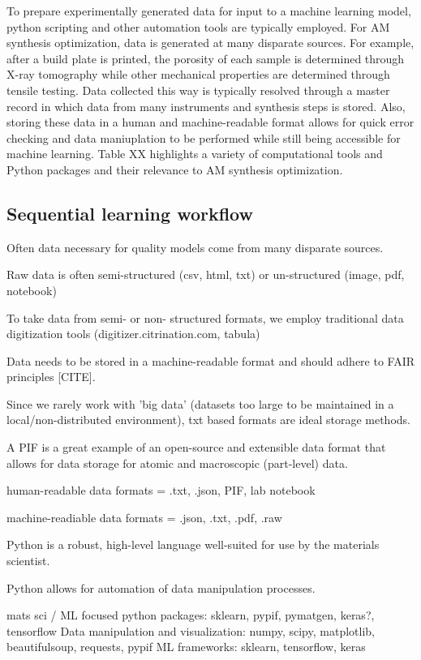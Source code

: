 To prepare experimentally generated data for input to a machine learning model, python scripting and other automation tools are typically employed.
For AM synthesis optimization, data is generated at many disparate sources.
For example, after a build plate is printed, the porosity of each sample is determined through X-ray tomography while other mechanical properties are determined through tensile testing.
Data collected this way is typically resolved through a master record in which data from many instruments and synthesis steps is stored.
Also, storing these data in a human and machine-readable format allows for quick error checking and data maniuplation to be performed while still being accessible for machine learning.
Table XX highlights a variety of computational tools and Python packages and their relevance to AM synthesis optimization.



\subsection{Sequential learning workflow}



Often data necessary for quality models come from many disparate sources.

Raw data is often semi-structured (csv, html, txt) or un-structured (image, pdf, notebook)

To take data from semi- or non- structured formats, we employ traditional data digitization tools (digitizer.citrination.com, tabula)

Data needs to be stored in a machine-readable format and should adhere to FAIR principles [CITE].

Since we rarely work with 'big data' (datasets too large to be maintained in a local/non-distributed environment), txt based formats are ideal storage methods.

A PIF is a great example of an open-source and extensible data format that allows for data storage for atomic and macroscopic (part-level) data.

human-readable data formats = .txt, .json, PIF, lab notebook

machine-readiable data formats = .json, .txt, .pdf, .raw

Python is a robust, high-level language well-suited for use by the materials scientist.

Python allows for automation of data manipulation processes.

mats sci / ML focused python packages: sklearn, pypif, pymatgen, keras?, tensorflow
Data manipulation and visualization: numpy, scipy, matplotlib, beautifulsoup, requests, pypif
ML frameworks: sklearn, tensorflow, keras
